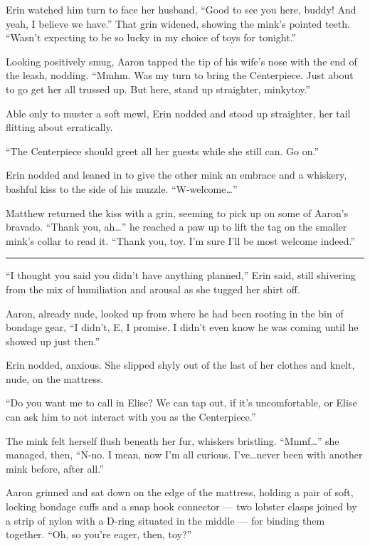 Erin watched him turn to face her husband, ``Good to see you here, buddy! And yeah, I believe we have.'' That grin widened, showing the mink's pointed teeth. ``Wasn't expecting to be so lucky in my choice of toys for tonight.''

Looking positively smug, Aaron tapped the tip of his wife's nose with the end of the leash, nodding. ``Mmhm. Was my turn to bring the Centerpiece. Just about to go get her all trussed up. But here, stand up straighter, minkytoy.''

Able only to muster a soft mewl, Erin nodded and stood up straighter, her tail flitting about erratically.

``The Centerpiece should greet all her guests while she still can. Go on.''

Erin nodded and leaned in to give the other mink an embrace and a whiskery, bashful kiss to the side of his muzzle. ``W-welcome\ldots{}''

Matthew returned the kiss with a grin, seeming to pick up on some of Aaron's bravado. ``Thank you, ah\ldots{}'' he reached a paw up to lift the tag on the smaller mink's collar to read it. ``Thank you, toy. I'm sure I'll be most welcome indeed.''

\begin{center}\rule{0.5\linewidth}{\linethickness}\end{center}

``I thought you said you didn't have anything planned,'' Erin said, still shivering from the mix of humiliation and arousal as she tugged her shirt off.

Aaron, already nude, looked up from where he had been rooting in the bin of bondage gear, ``I didn't, E, I promise. I didn't even know he was coming until he showed up just then.''

Erin nodded, anxious. She slipped shyly out of the last of her clothes and knelt, nude, on the mattress.

``Do you want me to call in Elise? We can tap out, if it's uncomfortable, or Elise can ask him to not interact with you as the Centerpiece.''

The mink felt herself flush beneath her fur, whiskers bristling. ``Mmnf\ldots{}'' she managed, then, ``N-no. I mean, now I'm all curious. I've\ldots{}never been with another mink before, after all.''

Aaron grinned and sat down on the edge of the mattress, holding a pair of soft, locking bondage cuffs and a snap hook connector --- two lobster clasps joined by a strip of nylon with a D-ring situated in the middle --- for binding them together. ``Oh, so you're eager, then, toy?''

